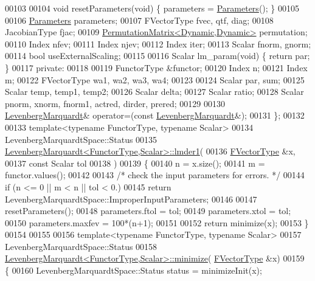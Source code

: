 \begin{DoxyCode}
00103 
00104     \textcolor{keywordtype}{void} resetParameters(\textcolor{keywordtype}{void}) \{ parameters = \hyperlink{struct_eigen_1_1_levenberg_marquardt_1_1_parameters}{Parameters}(); \}
00105 
00106     \hyperlink{struct_eigen_1_1_levenberg_marquardt_1_1_parameters}{Parameters} parameters;
00107     FVectorType  fvec, qtf, diag;
00108     JacobianType fjac;
00109     \hyperlink{group___core___module}{PermutationMatrix<Dynamic,Dynamic>} permutation;
00110     Index nfev;
00111     Index njev;
00112     Index iter;
00113     Scalar fnorm, gnorm;
00114     \textcolor{keywordtype}{bool} useExternalScaling; 
00115 
00116     Scalar lm\_param(\textcolor{keywordtype}{void}) \{ \textcolor{keywordflow}{return} par; \}
00117 \textcolor{keyword}{private}:
00118     
00119     FunctorType &functor;
00120     Index n;
00121     Index m;
00122     FVectorType wa1, wa2, wa3, wa4;
00123 
00124     Scalar par, sum;
00125     Scalar temp, temp1, temp2;
00126     Scalar delta;
00127     Scalar ratio;
00128     Scalar pnorm, xnorm, fnorm1, actred, dirder, prered;
00129 
00130     \hyperlink{class_eigen_1_1_levenberg_marquardt}{LevenbergMarquardt}& operator=(\textcolor{keyword}{const} \hyperlink{class_eigen_1_1_levenberg_marquardt}{LevenbergMarquardt}&);
00131 \};
00132 
00133 \textcolor{keyword}{template}<\textcolor{keyword}{typename} FunctorType, \textcolor{keyword}{typename} Scalar>
00134 LevenbergMarquardtSpace::Status
00135 \hyperlink{class_eigen_1_1_levenberg_marquardt}{LevenbergMarquardt<FunctorType,Scalar>::lmder1}(
00136         \hyperlink{group___core___module}{FVectorType}  &x,
00137         \textcolor{keyword}{const} Scalar tol
00138         )
00139 \{
00140     n = x.size();
00141     m = functor.values();
00142 
00143     \textcolor{comment}{/* check the input parameters for errors. */}
00144     \textcolor{keywordflow}{if} (n <= 0 || m < n || tol < 0.)
00145         \textcolor{keywordflow}{return} LevenbergMarquardtSpace::ImproperInputParameters;
00146 
00147     resetParameters();
00148     parameters.ftol = tol;
00149     parameters.xtol = tol;
00150     parameters.maxfev = 100*(n+1);
00151 
00152     \textcolor{keywordflow}{return} minimize(x);
00153 \}
00154 
00155 
00156 \textcolor{keyword}{template}<\textcolor{keyword}{typename} FunctorType, \textcolor{keyword}{typename} Scalar>
00157 LevenbergMarquardtSpace::Status
00158 \hyperlink{class_eigen_1_1_levenberg_marquardt}{LevenbergMarquardt<FunctorType,Scalar>::minimize}(
      \hyperlink{group___core___module}{FVectorType}  &x)
00159 \{
00160     LevenbergMarquardtSpace::Status status = minimizeInit(x);

\end{DoxyCode}
